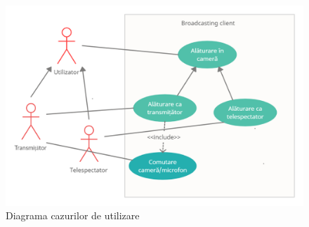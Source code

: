 \begin{figure}[!htbp]
    \centering
    \includegraphics[width=12cm]{figures/app_use_case_diagram.png}
    \caption{Diagrama cazurilor de utilizare}
\end{figure}

